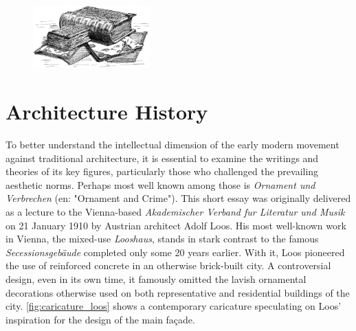 \documentclass[a4paper]{article}
\begin{document}
\begin{figure}[h]
  \centering
  \includegraphics[width=0.4\textwidth]{./figures/books.jpg}
\end{figure}

\tableofcontents

\clearpage
\section{Architecture History}

\begin{mdframed}[linewidth=1pt, roundcorner=5pt, innerleftmargin=10pt, innerrightmargin=10pt, innertopmargin=10pt, innerbottommargin=10pt, linecolor=black, backgroundcolor=white, userdefinedwidth=\textwidth]
    To better understand the intellectual dimension of the early modern movement against traditional architecture, it is essential to examine the writings and theories of its key figures, particularly those who challenged the prevailing aesthetic norms. Perhaps most well known among those is \textit{Ornament und Verbrechen} \cite{loos_ornament_1908} (en: "Ornament and Crime"). This short essay was originally delivered as a lecture to the Vienna-based \textit{Akademischer Verband fur Literatur und Musik} on 21 January 1910 by Austrian architect Adolf Loos. His most well-known work in Vienna, the mixed-use \textit{Looshaus}, stands in stark contrast to the famous \textit{Secessionsgebäude} completed only some 20 years earlier. With it, Loos pioneered the use of reinforced concrete in an otherwise brick-built city. A controversial design, even in its own time, it famously omitted the lavish ornamental decorations otherwise used on both representative and residential buildings of the city. \cref{fig:caricature_loos} shows a contemporary caricature speculating on Loos' inspiration for the design of the main façade.


\end{mdframed}
\end{document}
